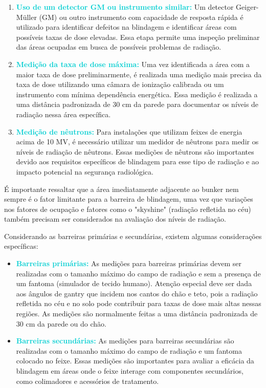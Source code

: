 \documentclass[11pt,a4paper]{article}
\begin{document}
	\begin{enumerate}[label=\textcolor{CarnationPink}{\arabic*${}^\circ$}]
		\item \textcolor{DarkTurquoise}{\textbf{Uso de um detector GM ou instrumento similar:}} Um detector Geiger-Müller (GM) ou outro instrumento com capacidade de resposta rápida é utilizado para identificar defeitos na blindagem e identificar áreas com possíveis taxas de dose elevadas. Essa etapa permite uma inspeção preliminar das áreas ocupadas em busca de possíveis problemas de radiação.

		\item \textcolor{DarkTurquoise}{\textbf{Medição da taxa de dose máxima:}} Uma vez identificada a área com a maior taxa de dose preliminarmente, é realizada uma medição mais precisa da taxa de dose utilizando uma câmara de ionização calibrada ou um instrumento com mínima dependência energética. Essa medição é realizada a uma distância padronizada de 30 cm da parede para documentar os níveis de radiação nessa área específica.

		\item \textcolor{DarkTurquoise}{\textbf{Medição de nêutrons:}} Para instalações que utilizam feixes de energia acima de 10 MV, é necessário utilizar um medidor de nêutrons para medir os níveis de radiação de nêutrons. Essas medições de nêutrons são importantes devido aos requisitos específicos de blindagem para esse tipo de radiação e ao impacto potencial na segurança radiológica.
	\end{enumerate}

	É importante ressaltar que a área imediatamente adjacente ao bunker nem sempre é o fator limitante para a barreira de blindagem, uma vez que variações nos fatores de ocupação e fatores como o "skyshine" (radiação refletida no céu) também precisam ser considerados na avaliação dos níveis de radiação.

	Considerando as barreiras primárias e secundárias, existem algumas considerações específicas:

	\begin{itemize}[label=\textcolor{CarnationPink}{\textbullet}]
		\item \textcolor{DarkTurquoise}{\textbf{Barreiras primárias:}} As medições para barreiras primárias devem ser realizadas com o tamanho máximo do campo de radiação e sem a presença de um fantoma (simulador de tecido humano). Atenção especial deve ser dada aos ângulos de gantry que incidem nos cantos do chão e teto, pois a radiação refletida no céu e no solo pode contribuir para taxas de dose mais altas nessas regiões. As medições são normalmente feitas a uma distância padronizada de 30 cm da parede ou do chão.

		\item \textcolor{DarkTurquoise}{\textbf{Barreiras secundárias:}} As medições para barreiras secundárias são realizadas com o tamanho máximo do campo de radiação e um fantoma colocado no feixe. Essas medições são importantes para avaliar a eficácia da blindagem em áreas onde o feixe interage com componentes secundários, como colimadores e acessórios de tratamento.
	\end{itemize}
\end{document}
